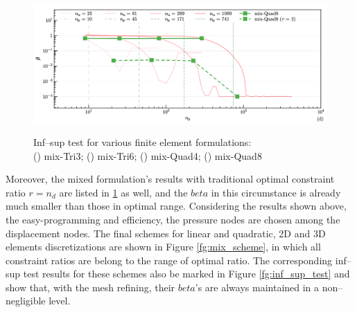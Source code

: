 \begin{figure}[H]
\begin{subcaptiongroup}
\includegraphics[width=\textwidth]{png/infsup_quad8.png}\label{d}
\end{subcaptiongroup}
\captionsetup{aboveskip=0pt}
\caption{\centering Inf--sup test for various finite element formulations: \\ () mix-Tri3; () mix-Tri6; () mix-Quad4; () mix-Quad8}
\label{fg:infsup_convergence}
\end{figure}

Moreover, the mixed formulation's results with traditional optimal constraint ratio $r=n_d$ are listed in \ref{fg:infsup_convergence} as well,
and the $beta$ in this circumstance is already much smaller than those in optimal range.
Considering the results shown above, the easy-programming and efficiency,
the pressure nodes are chosen among the displacement nodes.
The final schemes for linear and quadratic, 2D and 3D elements discretizations are shown in Figure \ref{fg:mix_scheme},
in which all constraint ratios are belong to the range of optimal ratio.
The corresponding inf--sup test results for these schemes also be marked in Figure \ref{fg:inf_sup_test} and show that,
with the mesh refining, their $beta$'s are always maintained in a non--negligible level.

